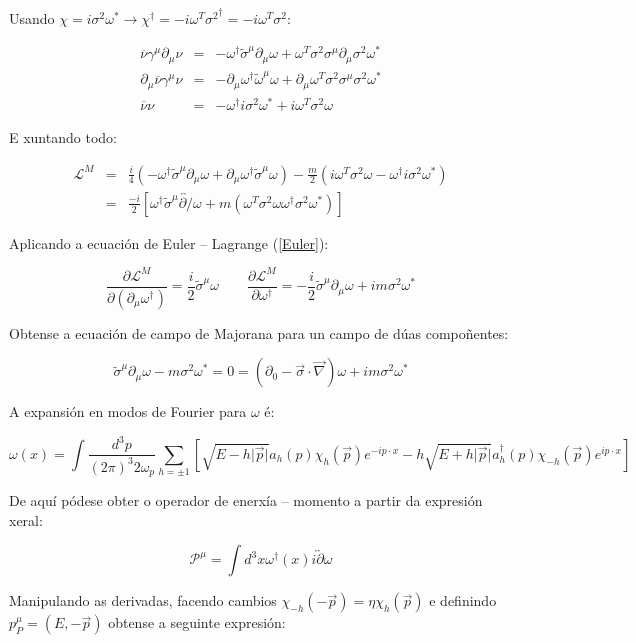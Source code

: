 \documentclass[a4paper,10pt]{article}
\newcommand{\beq}{\begin{equation}}
\newcommand{\eeq}{\end{equation}}
\newcommand{\bea}{\begin{eqnarray}}
\newcommand{\eea}{\end{eqnarray}}
\newcommand{\barra}[1]{\overline{#1}}
\newcommand{\h}[1]{#1^\dagger}
\newcommand{\abs}[1]{\vert #1 \vert}
\newcommand{\rvec}[1]{\overrightarrow{#1}}
\newcommand{\dvec}[1]{\overleftrightarrow{#1}}
\newcommand{\chula}[1]{\mathcal{#1}}
\newcommand{\slx}[1]{ #1\!\!\!/ }
\newcommand{\derp}[2]{\frac{\partial#1}{\partial#2}}
\newcommand{\pdp}[1]{\footnotemark\footnotetext{#1}}
\begin{document}
Usando $\chi = i \sigma^2 \omega^* \rightarrow \h\chi = - i \omega^T {\sigma^2}^\dag = -i \omega^T \sigma^2$:

\bea
\barra\nu \gamma^\mu \partial_\mu \nu &=& -\h\omega \tilde\sigma^\mu \partial_\mu \omega + \omega^T \sigma^2 \sigma^\mu \partial_\mu \sigma^2 \omega^* \\
\partial_\mu \barra\nu \gamma^\mu \nu &=& -\partial_\mu \h\omega \tilde\omega^\mu \omega + \partial_\mu \omega^T \sigma^2 \sigma^\mu \sigma^2 \omega^* \\
\barra\nu \nu &=& -\h\omega i \sigma^2 \omega^* + i \omega^T \sigma^2 \omega
\eea

E xuntando todo:

\bea
\chula L^M &=& \frac{i}{4} \left( -\h\omega \tilde\sigma^\mu \partial_\mu \omega + \partial_\mu \h\omega \tilde\sigma^\mu \omega \right) - \frac{m}{2} \left( i\omega^T \sigma^2 \omega - \h\omega i \sigma^2 \omega^* \right) \nonumber \\
&=& \frac{-i}{2} \left[ \h\omega \tilde\sigma^\mu \dvec{\slx\partial} \omega + m \left( \omega^T \sigma^2 \omega  \h\omega \sigma^2 \omega^* \right) \right]
\eea

Aplicando a ecuación de Euler – Lagrange (\ref{Euler}):

\beq
\derp{\chula L^M}{(\partial_\mu \h\omega)} = \frac{i}{2} \tilde\sigma^\mu \omega \qquad
\derp{\chula L^M}{\h\omega} = - \frac{i}{2} \tilde\sigma^\mu \partial_\mu \omega + im \sigma^2 \omega^*
\eeq

Obtense a ecuación de campo de Majorana para un campo de dúas compoñentes:

\beq
\tilde\sigma^\mu \partial_\mu \omega - m \sigma^2 \omega^* = 0 = \left( \partial_0 - \rvec\sigma \cdot \rvec\nabla \right) \omega + im \sigma^2 \omega^*
\eeq

A expansión en modos de Fourier para $\omega$ é:

\beq
\omega (x) = \int \frac{d^3p}{(2\pi)^3 2\omega_p} \sum_{h=\pm 1} \left[ \sqrt{E-h\abs{\rvec p}} a_h (p) \chi_h (\rvec p) e^{-ip \cdot x} - h \sqrt{E+h\abs{\rvec p}} \h a_h (p) \chi_{-h} (\rvec p) e^{ip \cdot x}\right]
\eeq

De aquí pódese obter o operador de enerxía – momento a partir da expresión xeral:

\beq
\chula P^\mu = \int d^3x \h\omega (x) i \dvec\partial \omega
\eeq

Manipulando as derivadas, facendo cambios $\chi_{-h} (-\rvec p) = \eta \chi_h (\rvec p ) $ \pdp{$\eta$ é unha fase: $\eta = \eta (\rvec p , h)$} e definindo $p_P^\mu = (E, -\rvec p)$ obtense a seguinte expresión:
\end{document}
